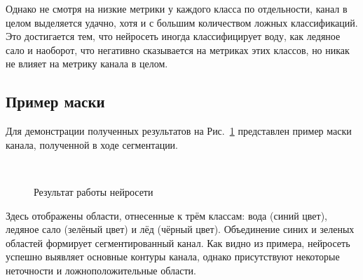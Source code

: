 Однако не смотря на низкие метрики у каждого класса по отдельности, канал в целом выделяется удачно, хотя и с большим количеством ложных классификаций. Это достигается 
тем, что нейросеть иногда классифицирует воду, как ледяное сало и наоборот, что негативно сказывается на метриках этих классов, но никак не влияет на метрику канала в целом.

\subsection{Пример маски}

Для демонстрации полученных результатов на Рис.~\ref{fig:nn_mask} представлен пример маски канала, полученной в ходе сегментации.

\begin{figure}[htbp]
    \centering
    \\
    \caption{Результат работы нейросети}\label{fig:nn_mask}
\end{figure}

Здесь отображены области, отнесенные к трём классам: вода (синий цвет), ледяное сало (зелёный цвет) и лёд (чёрный цвет). 
Объединение синих и зеленых областей формирует сегментированный канал. Как видно из примера, нейросеть успешно выявляет основные контуры канала, 
однако присутствуют некоторые неточности и ложноположительные области.

